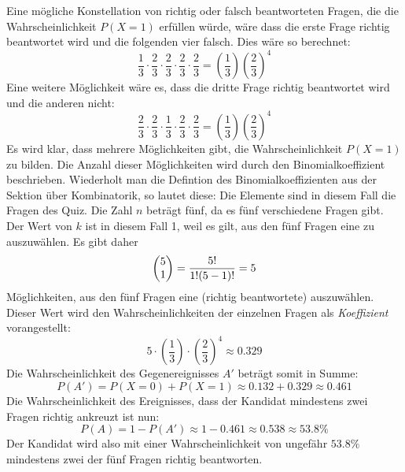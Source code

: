 Eine m\"{o}gliche Konstellation von richtig oder falsch beantworteten Fragen, die die Wahrscheinlichkeit $P(X = 1)$ erf\"{u}llen w\"{u}rde, w\"{a}re dass die erste Frage richtig beantwortet wird und die folgenden vier falsch. Dies w\"{a}re so berechnet: $$\frac{1}{3} \cdot \frac{2}{3} \cdot \frac{2}{3} \cdot \frac{2}{3} \cdot \frac{2}{3} = \left(\frac{1}{3}\right) \left(\frac{2}{3}\right)^4$$ Eine weitere M\"{o}glichkeit w\"{a}re es, dass die dritte Frage richtig beantwortet wird und die anderen nicht: $$\frac{2}{3} \cdot \frac{2}{3} \cdot \frac{1}{3} \cdot \frac{2}{3} \cdot \frac{2}{3} = \left(\frac{1}{3}\right) \left(\frac{2}{3}\right)^4$$ Es wird klar, dass mehrere M\"{o}glichkeiten gibt, die Wahrscheinlichkeit $P(X = 1)$ zu bilden. Die Anzahl dieser M\"{o}glichkeiten wird durch den Binomialkoeffizient beschrieben. Wiederholt man die Defintion des Binomialkoeffizienten aus der Sektion \"{u}ber Kombinatorik, so lautet diese:  Die Elemente sind in diesem Fall die Fragen des Quiz. Die Zahl $n$ betr\"{a}gt f\"{u}nf, da es f\"{u}nf verschiedene Fragen gibt. Der Wert von $k$ ist in diesem Fall 1, weil es gilt, aus den f\"{u}nf Fragen eine zu auszuw\"{a}hlen. Es gibt daher $$\begin{pmatrix}5 \\ 1\end{pmatrix} = \frac{5!}{1! (5 - 1)!} = 5$$ M\"{o}glichkeiten, aus den f\"{u}nf Fragen eine (richtig beantwortete) auszuw\"{a}hlen. Dieser Wert wird den Wahrscheinlichkeiten der einzelnen Fragen als \emph{Koeffizient} vorangestellt: $$5 \cdot \left(\frac{1}{3}\right) \cdot \left(\frac{2}{3}\right)^4 \approx 0.329$$ Die Wahrscheinlichkeit des Gegenereignisses $A'$ betr\"{a}gt somit in Summe: $$P(A') = P(X=0) + P(X=1) \approx 0.132 + 0.329 \approx 0.461$$ Die Wahrscheinlichkeit  des Ereignisses, dass der Kandidat mindestens zwei Fragen richtig ankreuzt ist nun: $$P(A) = 1 - P(A') \approx 1 - 0.461 \approx 0.538 \approx 53.8 \%$$ Der Kandidat wird also mit einer Wahrscheinlichkeit von ungef\"{a}hr $53.8\%$ mindestens zwei der f\"{u}nf Fragen richtig beantworten.

